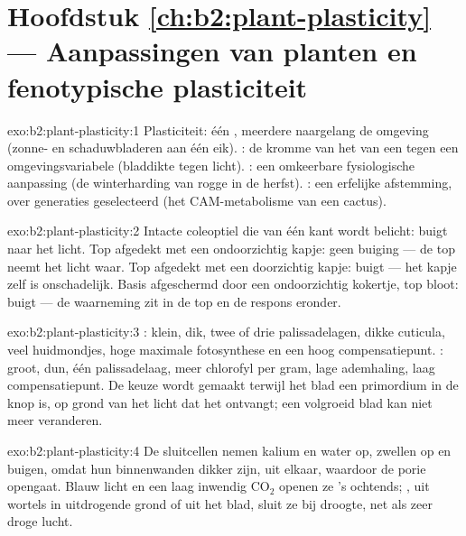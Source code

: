\section*{Hoofdstuk \ref{ch:b2:plant-plasticity} --- Aanpassingen van planten en fenotypische plasticiteit}

\begin{solution}{exo:b2:plant-plasticity:1}
Plasticiteit: één , meerdere  naargelang de omgeving
(zonne- en schaduwbladeren aan één eik). : de kromme van het
 van een  tegen een omgevingsvariabele (bladdikte tegen
licht). : een omkeerbare fysiologische aanpassing (de
winterharding van rogge in de herfst). : een erfelijke afstemming,
over generaties geselecteerd (het CAM-metabolisme van een cactus).
\end{solution}

\begin{solution}{exo:b2:plant-plasticity:2}
Intacte coleoptiel die van één kant wordt belicht: buigt naar het licht. Top
afgedekt met een ondoorzichtig kapje: geen buiging --- de top neemt het
licht waar. Top afgedekt met een doorzichtig kapje: buigt --- het kapje zelf
is onschadelijk. Basis afgeschermd door een ondoorzichtig kokertje, top
bloot: buigt --- de waarneming zit in de top en de respons eronder.
\end{solution}

\begin{solution}{exo:b2:plant-plasticity:3}
: klein, dik, twee of drie palissadelagen, dikke cuticula, veel
huidmondjes, hoge maximale fotosynthese en een hoog compensatiepunt.
: groot, dun, één palissadelaag, meer chlorofyl per gram, lage
ademhaling, laag compensatiepunt. De keuze wordt gemaakt terwijl het blad
een primordium in de knop is, op grond van het licht dat het ontvangt; een
volgroeid blad kan niet meer veranderen.
\end{solution}

\begin{solution}{exo:b2:plant-plasticity:4}
De sluitcellen nemen kalium en water op, zwellen op en buigen, omdat hun
binnenwanden dikker zijn, uit elkaar, waardoor de porie opengaat. Blauw
licht en een laag inwendig $\mathrm{CO_2}$ openen ze 's ochtends;
, uit wortels in uitdrogende grond of uit het blad, sluit ze
bij droogte, net als zeer droge lucht.
\end{solution}

